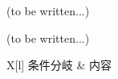 

(to be written...)


\modHeadsection{\TBW}
(to be written...)

\begin{multicollongtblr}{\TBW}{X[l]}
条件分岐 & 内容\\
\end{multicollongtblr}


\clearrightpage
